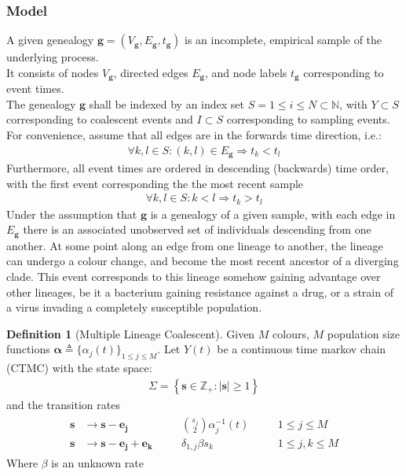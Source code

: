 \documentclass{ieeeaccess}
\newcommand{\N}{\mathbb{N}}
\newcommand{\Z}{\mathbb{Z}}
\theoremstyle{definition}
\newtheorem{definition}{Definition}[section]
\begin{document}
\subsubsection{Model}
A given genealogy $\mathbf{g}=(V_\mathbf{g}, E_\mathbf{g}, t_\mathbf{g})$ is an incomplete, empirical sample of the underlying process.\\
It consists of nodes $V_\mathbf{g}$, directed edges $E_\mathbf{g}$, and node labels $t_\mathbf{g}$ corresponding to event times.\\
The genealogy $\mathbf{g}$ shall be indexed by an index set $S=1\leq i \leq N\subset \N$, with $Y\subset S$ corresponding to coalescent events and $I\subset S$ corresponding to sampling events.\\
For convenience, assume that all edges are in the forwards time direction, i.e.: 
\begin{gather*}
\forall k,l \in S: (k,l)\in E_\mathbf{g} \Rightarrow t_k<t_l
\end{gather*}
Furthermore, all event times are ordered in descending (backwards) time order, with the first event corresponding the the most recent sample
\begin{gather*}
\forall k,l \in S: k<l \Rightarrow t_k > t_l
\end{gather*}
Under the assumption that $\mathbf{g}$ is a genealogy of a given sample, with each edge in $E_\mathbf{g}$ there is an associated unobserved set of individuals descending from one another. At some point along an edge from one lineage to another, the lineage can undergo a colour change, and become the most recent ancestor of a diverging clade. This event corresponds to this lineage somehow gaining advantage over other lineages, be it a bacterium gaining resistance against a drug, or a strain of a virus invading a completely susceptible population.
\begin{definition}[Multiple Lineage Coalescent]\label{def:model}
Given $M$ colours, $M$ population size functions $\mathbf{\alpha}\triangleq\{\alpha_j(t)\}_{1\leq j\leq M}$. Let $Y(t)$ be a continuous time markov chain (CTMC) with the state space:
\begin{gather}
  \Sigma = \left\{\mathbf{s}\in \Z_+: |\mathbf{s}|\geq1\right\}
\end{gather}
and the transition rates
\begin{gather}\label{eq:multirate}
\begin{align}
\mathbf{s}&\to\mathbf{s}-\mathbf{e_j} &\quad& \binom{s_j}{2}\alpha_j^{-1}(t)&\quad&1\leq j\leq M\\
\mathbf{s}&\to\mathbf{s}-\mathbf{e_j}+\mathbf{e_k}&\quad& \delta_{1,j}\beta s_k&\quad&1\leq j,k\leq M
\end{align}
\end{gather}
Where $\beta$ is an unknown rate
\end{definition}
\end{document}
